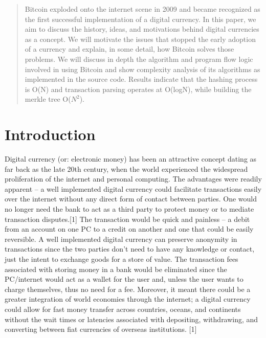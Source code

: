 \documentclass[pdftex,11pt]{article}
\begin{document}


\tableofcontents
\newpage

\begin{abstract}
Bitcoin exploded onto the internet scene in 2009 and became recognized as the first successful implementation of a digital currency. In this paper, we aim to discuss the history, ideas, and motivations behind digital currencies as a concept. We will motivate the issues that stopped the early adoption of a currency and explain, in some detail, how Bitcoin solves those problems. We will discuss in depth the algorithm and program flow logic involved in using Bitcoin and show complexity analysis of its algorithms as implemented in the source code. Results indicate that the hashing process is O(N) and transaction parsing operates at O(logN), while building the merkle tree O($N^2$). 
\end{abstract}

\section{Introduction}
Digital currency (or: electronic money) has been an attractive concept dating as far back as the late 20th century, when the world experienced the widespread proliferation of the internet and personal computing. The advantages were readily apparent --  a well implemented digital currency could facilitate transactions easily over the internet without any direct form of contact between parties. One would no longer need the bank to act as a third party to protect money or to mediate transaction disputes.[1] The transaction would be quick and painless -- a debit from an account on one PC to a credit on another and one that could be easily reversible. A well implemented digital currency can preserve anonymity in transactions since the two parties don't need to have any knowledge or contact, just the intent to exchange goods for a store of value. The transaction fees associated with storing money in a bank would be eliminated since the PC/internet would act as a wallet for the user and, unless the user wants to charge themselves, thus no need for a fee. Moreover, it meant there could be a greater integration of world economies through the internet; a digital currency could allow for fast money transfer across countries, oceans, and continents without the wait times or latencies associated with depositing, withdrawing, and converting between fiat currencies of overseas institutions. [1]
\end{document}

